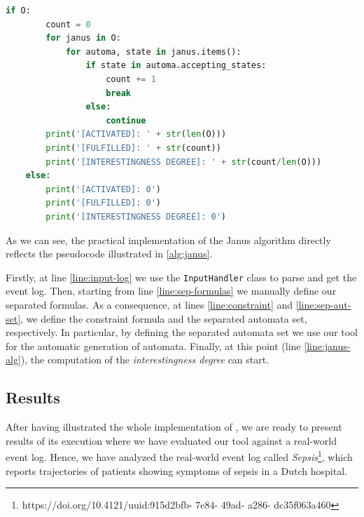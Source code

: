 \begin{lstlisting}[language=Python, style=Python, escapechar = £, label={code:janus-main}, caption={The \texttt{janus.py} module}]
    if O:
        count = 0
        for janus in O:
            for automa, state in janus.items():
                if state in automa.accepting_states:
                    count += 1
                    break
                else:
                    continue
        print('[ACTIVATED]: ' + str(len(O)))
        print('[FULFILLED]: ' + str(count))
        print('[INTERESTINGNESS DEGREE]: ' + str(count/len(O)))
    else:
        print('[ACTIVATED]: 0')
        print('[FULFILLED]: 0')
        print('[INTERESTINGNESS DEGREE]: 0')
\end{lstlisting}
As we can see, the practical implementation of the Janus algorithm directly reflects the pseudocode illustrated in \ref{alg:janus}. 

Firstly, at line \ref{line:input-log} we use the \texttt{InputHandler} class to parse and get the event log. Then, starting from line \ref{line:sep-formulas} we manually define our separated formulas. As a consequence, at lines \ref{line:constraint} and \ref{line:sep-aut-set}, we define the constraint formula and the separated automata set, respectively. In particular, by defining the separated automata set we use our tool \LTLfToDFA for the automatic generation of automata. Finally, at this point (line \ref{line:janus-alg}), the computation of the \textit{interestingness degree} can start.
\subsection{Results}
After having illustrated the whole implementation of \janus, we are ready to present results of its execution where we have evaluated our tool against a real-world event log. Hence, we have analyzed the real-world event log called \textit{Sepsis}\footnote{https://doi.org/10.4121/uuid:915d2bfb- 7e84- 49ad- a286- dc35f063a460}, which reports trajectories of patients showing symptoms of sepsis in a Dutch hospital.

